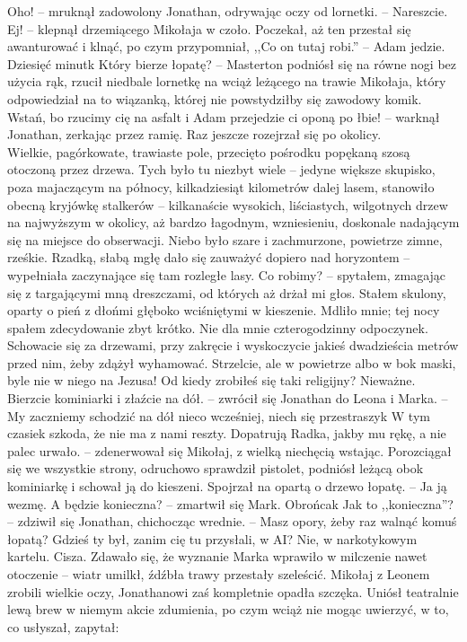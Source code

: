 \documentclass[../MAIN.tex]{subfiles}
\begin{document}
\sx Oho! -- mruknął zadowolony Jonathan, odrywając oczy od lornetki. -- Nareszcie. Ej! -- klepnął drzemiącego Mikołaja w czoło. Poczekał, aż ten przestał się awanturować i klnąć, po czym przypomniał, ,,Co on tutaj robi.'' -- Adam jedzie.
\xx Dziesięć minut\3k Który bierze łopatę? -- Masterton podniósł się na równe nogi bez użycia rąk, rzucił niedbale lornetkę na wciąż leżącego na trawie Mikołaja, który odpowiedział na to wiązanką, której nie powstydziłby się zawodowy komik.
\xx Wstań, bo rzucimy cię na asfalt i Adam przejedzie ci oponą po łbie! -- warknął Jonathan, zerkając przez ramię.
\qd
Raz jeszcze rozejrzał się po okolicy.\\
Wielkie, pagórkowate, trawiaste pole, przecięto pośrodku popękaną szosą otoczoną przez drzewa. Tych było tu niezbyt wiele -- jedyne większe skupisko, poza majaczącym na północy, kilkadziesiąt kilometrów dalej lasem, stanowiło obecną kryjówkę stalkerów -- kilkanaście wysokich, liściastych, wilgotnych drzew na najwyższym w okolicy, aż bardzo łagodnym, wzniesieniu, doskonale nadającym się na miejsce do obserwacji. Niebo było szare i zachmurzone, powietrze zimne, rześkie. Rzadką, słabą mgłę dało się zauważyć dopiero nad horyzontem -- wypełniała zaczynające się tam rozległe lasy.
\sx Co robimy? -- spytałem, zmagając się z targającymi mną dreszczami, od których aż drżał mi głos.
\qd
Stałem skulony, oparty o pień z dłońmi głęboko wciśniętymi w kieszenie. Mdliło mnie; tej nocy spałem zdecydowanie zbyt krótko. Nie dla mnie czterogodzinny odpoczynek.
\sx Schowacie się za drzewami, przy zakręcie i wyskoczycie jakieś dwadzieścia metrów przed nim, żeby zdążył wyhamować. Strzelcie, ale w powietrze albo w bok maski, byle nie w niego na Jezusa!
\xx Od kiedy zrobiłeś się taki religijny?
\xx Nieważne. Bierzcie kominiarki i złaźcie na dół. -- zwrócił się Jonathan do Leona i Marka. -- My zaczniemy schodzić na dół nieco wcześniej, niech się przestraszy\3k W tym czasie\3k szkoda, że nie ma z nami reszty.
\xx Dopatrują Radka, jakby mu rękę, a nie palec urwało. -- zdenerwował się Mikołaj, z wielką niechęcią wstając.
\qd
Porozciągał się we wszystkie strony, odruchowo sprawdził pistolet, podniósł leżącą obok kominiarkę i schował ją do kieszeni. Spojrzał na opartą o drzewo łopatę. -- Ja ją wezmę.
\sx A będzie konieczna? -- zmartwił się Mark. Obrońca\3k
\xx Jak to ,,konieczna''? -- zdziwił się Jonathan, chichocząc wrednie. -- Masz opory, żeby raz walnąć komuś łopatą? Gdzieś ty był, zanim cię tu przysłali, w AI?
\xx Nie, w narkotykowym kartelu.
\qd
Cisza. Zdawało się, że wyznanie Marka wprawiło w milczenie nawet otoczenie -- wiatr umilkł, źdźbła trawy przestały szeleścić. Mikołaj z Leonem zrobili wielkie oczy, Jonathanowi zaś kompletnie opadła szczęka. Uniósł teatralnie lewą brew w niemym akcie zdumienia, po czym wciąż nie mogąc uwierzyć, w to, co usłyszał, zapytał:
\end{document}
